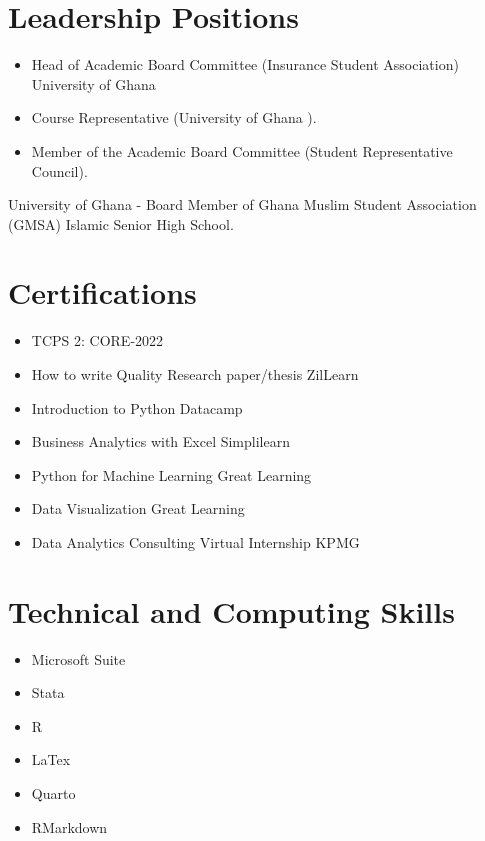 \documentclass[
  letterpaper,
  DIV=11,
  numbers=noendperiod]{scrartcl}
\providecommand{\tightlist}{%
  \setlength{\itemsep}{0pt}\setlength{\parskip}{0pt}}\usepackage{longtable,booktabs,array}
\begin{document}
\hypertarget{leadership-positions}{%
\section{Leadership Positions}\label{leadership-positions}}

\begin{itemize}
\item
  Head of Academic Board Committee (Insurance Student Association)
  University of Ghana
\item
  Course Representative (University of Ghana ).
\item
  Member of the Academic Board Committee (Student Representative
  Council).
\end{itemize}

University of Ghana - Board Member of Ghana Muslim Student Association
(GMSA) Islamic Senior High School.

\hypertarget{certifications}{%
\section{Certifications}\label{certifications}}

\begin{itemize}
\item
  TCPS 2: CORE-2022
\item
  How to write Quality Research paper/thesis ZilLearn
\item
  Introduction to Python Datacamp
\item
  Business Analytics with Excel Simplilearn
\item
  Python for Machine Learning Great Learning
\item
  Data Visualization Great Learning
\item
  Data Analytics Consulting Virtual Internship KPMG
\end{itemize}

\hypertarget{technical-and-computing-skills}{%
\section{Technical and Computing
Skills}\label{technical-and-computing-skills}}

\begin{itemize}
\tightlist
\item
  Microsoft Suite
\item
  Stata
\item
  R
\item
  LaTex
\item
  Quarto
\item
  RMarkdown
\end{itemize}
\end{document}
